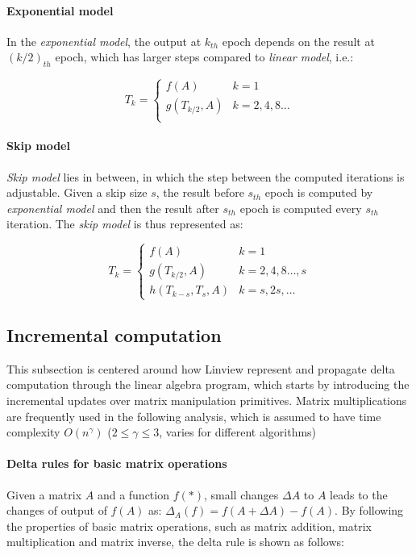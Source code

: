 \paragraph{Exponential model} In the {\em exponential model}, the output at $k_{th}$ epoch depends on the result at $(k/2)_{th}$ epoch, which has larger steps compared to {\em linear model}, i.e.:

\[
T_k=
\begin{cases}
f(A)& k=1\\
g(T_{k/2}, A) & k=2,4,8\dots\\
\end{cases}
\]

\paragraph{Skip model} {\em Skip model} lies in between, in which the step between the computed iterations is adjustable. Given a skip size $s$, the result before $s_{th}$ epoch is computed by {\em exponential model} and then the result after $s_{th}$ epoch is computed every $s_{th}$ iteration. The {\em skip model} is thus represented as:

\[
T_k=
\begin{cases}
f(A)& k=1\\
g(T_{k/2}, A) & k=2,4,8\dots,s\\
h(T_{k-s}, T_{s}, A) & k=s, 2s,\dots
\end{cases}
\]

\subsection{Incremental computation}
This subsection is centered around how Linview represent and propagate delta computation through the linear algebra program, which starts by introducing the incremental updates over matrix manipulation primitives. Matrix multiplications are frequently used in the following analysis, which is assumed to have time complexity $O(n^{\gamma})$ ($2\leq \gamma \leq 3$, varies for different algorithms)

\paragraph{Delta rules for basic matrix operations}
Given a matrix $A$ and a function $f(*)$, small changes $\Delta A$ to $A$ leads to the changes of output of $f(A)$ as: $\Delta_A(f) = f(A+\Delta A) - f(A)$. By following the properties of basic matrix operations, such as matrix addition, matrix multiplication and matrix inverse, the delta rule is shown as follows:

